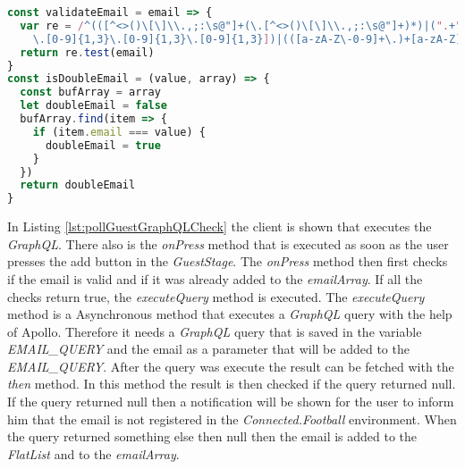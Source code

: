 \begin{lstlisting}[language=javascript, caption=Check E-Mail Methods, label=lst:pollGuestsCheck]
const validateEmail = email => {
  var re = /^(([^<>()\[\]\\.,;:\s@"]+(\.[^<>()\[\]\\.,;:\s@"]+)*)|(".+"))@((\[[0-9]{1,3}
    \.[0-9]{1,3}\.[0-9]{1,3}\.[0-9]{1,3}])|(([a-zA-Z\-0-9]+\.)+[a-zA-Z]{2,}))$/
  return re.test(email)
}
const isDoubleEmail = (value, array) => {
  const bufArray = array
  let doubleEmail = false
  bufArray.find(item => {
    if (item.email === value) {
      doubleEmail = true
    }
  })
  return doubleEmail
}
\end{lstlisting}

In Listing \ref{lst:pollGuestGraphQLCheck} the client is shown that executes the \textit{GraphQL}. There also is the \textit{onPress} method that is executed as soon as the user presses the add button in the \textit{GuestStage}. The \textit{onPress} method then first checks if the email is valid and if it was already added to the \textit{emailArray}. If all the checks return true, the \textit{executeQuery} method is executed. 
\newline
The \textit{executeQuery} method is a Asynchronous method that executes a \textit{GraphQL} query with the help of Apollo. Therefore it needs a \textit{GraphQL} query that is saved in the variable \textit{EMAIL\_QUERY} and the email as a parameter that will be added to the \textit{EMAIL\_QUERY}. After the query was execute the result can be fetched with the \textit{then} method. In this method the result is then checked if the query returned null. If the query returned null then a notification will be shown for the user to inform him that the email is not registered in the \textit{Connected.Football} environment. When the query returned something else then null then the email is added to the \textit{FlatList} and to the \textit{emailArray}.

